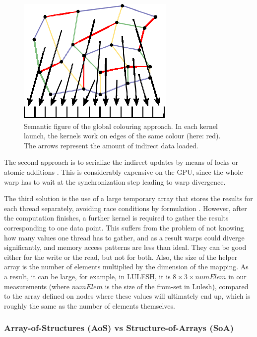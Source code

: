 \begin{figure}[Htpb]
  \centering
  \includegraphics{fig/svg/unstructured_global.eps}
  \caption{Semantic figure of the global colouring approach. In each kernel
  launch, the kernels work on edges of the same colour (here: red). The arrows
  represent the amount of indirect data loaded.}
  \label{fig:unstructured_global}
\end{figure}

The second approach is to serialize the indirect updates by means of locks or
atomic additions \cite{Kraus:2014:ACC:2691158.2691164}. This is considerably 
expensive on the GPU, since the whole warp has to wait at the synchronization 
step leading to warp divergence.

The third solution is the use of a large temporary array that stores the
results for each thread separately, avoiding race conditions by formulation 
\cite{LULESH:spec,miniaero}. However, after the computation finishes, a 
further kernel is required to gather the results corresponding to one data 
point. This suffers from the problem of not knowing how many values one thread 
has to gather, and as a result warps could diverge significantly, and 
memory access patterns are less than ideal. They can be good either for the 
write or the read, but not for both. Also, the size of the helper array is the 
number of elements multiplied by the dimension of the mapping. As a result, it 
can be large, for example, in LULESH, it is \(8 \times 3 \times numElem \) 
in our measurements (where $numElem$ is the size of the from-set in Lulesh), 
compared to the array defined on nodes where these values will ultimately end 
up, which is roughly the same as the number of elements themselves.

\subsubsection{Array-of-Structures (AoS) vs Structure-of-Arrays (SoA)} 
\label{aos-to-soa}

